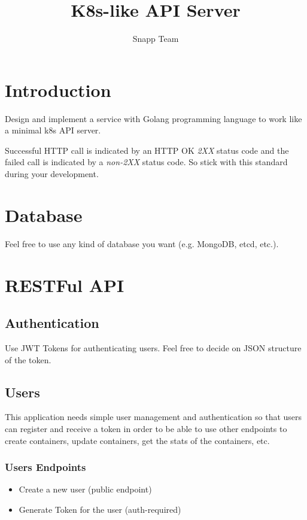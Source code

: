 \documentclass{article}
\begin{document}
\title{K8s-like API Server}
\author{Snapp Team}

\maketitle
\tableofcontents

\section{Introduction}

Design and implement a service with Golang programming language to work like a minimal k8s API server.

Successful HTTP call is indicated by an HTTP OK \textit{2XX} status code and the failed call is indicated by a \textit{non-2XX} status code.
So stick with this standard during your development.

\section{Database}

Feel free to use any kind of database you want (e.g. MongoDB, etcd, etc.).

\section{RESTFul API}

\subsection{Authentication}
Use JWT Tokens for authenticating users. Feel free to decide on JSON structure of the token.

\subsection{Users}
This application needs simple user management and authentication so that users can register and receive a token in order to be able to use other endpoints to create containers, update containers, get the stats of the containers, etc.

\subsubsection{Users Endpoints}
\begin{itemize}
  \item Create a new user (public endpoint)
  \item Generate Token for the user (auth-required)
\end{itemize}
\end{document}
